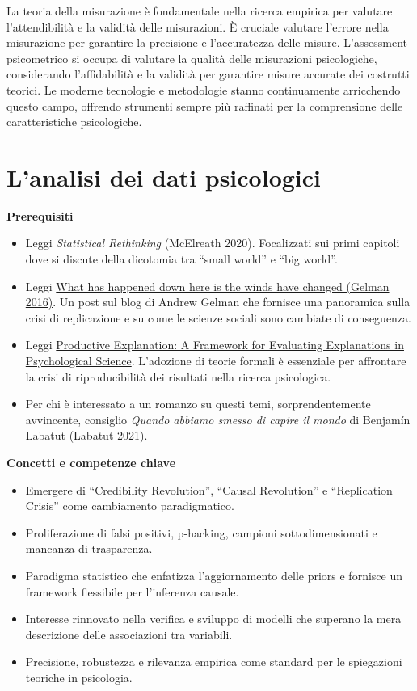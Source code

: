 \documentclass[
  letterpaper,
  krantz2]{{[}./krantz{]}}
\providecommand{\tightlist}{%
  \setlength{\itemsep}{0pt}\setlength{\parskip}{0pt}}\usepackage{longtable,booktabs,array}
\begin{document}
La teoria della misurazione è fondamentale nella ricerca empirica per
valutare l'attendibilità e la validità delle misurazioni. È cruciale
valutare l'errore nella misurazione per garantire la precisione e
l'accuratezza delle misure. L'assessment psicometrico si occupa di
valutare la qualità delle misurazioni psicologiche, considerando
l'affidabilità e la validità per garantire misure accurate dei costrutti
teorici. Le moderne tecnologie e metodologie stanno continuamente
arricchendo questo campo, offrendo strumenti sempre più raffinati per la
comprensione delle caratteristiche psicologiche.

\chapter{L'analisi dei dati psicologici}\label{sec-scientific-method}

\textbf{Prerequisiti}

\begin{itemize}
\tightlist
\item
  Leggi \emph{Statistical Rethinking} (McElreath 2020). Focalizzati sui
  primi capitoli dove si discute della dicotomia tra ``small world'' e
  ``big world''.
\item
  Leggi
  \href{https://statmodeling.stat.columbia.edu/2016/09/21/what-has-happened-down-here-is-the-winds-have-changed/}{What
  has happened down here is the winds have changed (Gelman 2016)}. Un
  post sul blog di Andrew Gelman che fornisce una panoramica sulla crisi
  di replicazione e su come le scienze sociali sono cambiate di
  conseguenza.
\item
  Leggi
  \href{https://psycnet.apa.org/fulltext/2025-04988-001.html}{Productive
  Explanation: A Framework for Evaluating Explanations in Psychological
  Science}. L'adozione di teorie formali è essenziale per affrontare la
  crisi di riproducibilità dei risultati nella ricerca psicologica.
\item
  Per chi è interessato a un romanzo su questi temi, sorprendentemente
  avvincente, consiglio \emph{Quando abbiamo smesso di capire il mondo}
  di Benjamín Labatut (Labatut 2021).
\end{itemize}

\textbf{Concetti e competenze chiave}

\begin{itemize}
\tightlist
\item
  Emergere di ``Credibility Revolution'', ``Causal Revolution'' e
  ``Replication Crisis'' come cambiamento paradigmatico.
\item
  Proliferazione di falsi positivi, p-hacking, campioni
  sottodimensionati e mancanza di trasparenza.
\item
  Paradigma statistico che enfatizza l'aggiornamento delle priors e
  fornisce un framework flessibile per l'inferenza causale.
\item
  Interesse rinnovato nella verifica e sviluppo di modelli che superano
  la mera descrizione delle associazioni tra variabili.
\item
  Precisione, robustezza e rilevanza empirica come standard per le
  spiegazioni teoriche in psicologia.
\end{itemize}
\end{document}
